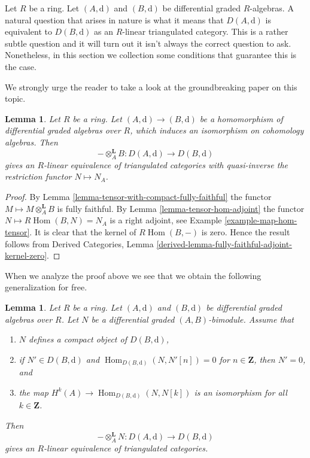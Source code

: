 \documentclass{stacks-project}
\theoremstyle{plain}
\newtheorem{lemma}[subsection]{Lemma}
\theoremstyle{definition}
\theoremstyle{remark}
\numberwithin{equation}{subsection}
\def\Hom{\mathop{\mathrm{Hom}}\nolimits}
\begin{document}
\noindent
Let $R$ be a ring. Let $(A, \text{d})$ and $(B, \text{d})$ be differential
graded $R$-algebras. A natural question that arises in nature is what
it means that $D(A, \text{d})$ is equivalent to $D(B, \text{d})$
as an $R$-linear triangulated category. This is a rather subtle question
and it will turn out it isn't always the correct question to ask.
Nonetheless, in this section we collection some conditions
that guarantee this is the case.

\medskip\noindent
We strongly urge the reader to take a look at the groundbreaking
paper \cite{Rickard} on this topic.

\begin{lemma}
\label{lemma-qis-equivalence}
Let $R$ be a ring. Let $(A, \text{d}) \to (B, \text{d})$ be a
homomorphism of differential graded algebras over $R$, which induces
an isomorphism on cohomology algebras. Then
$$
- \otimes_A^\mathbf{L} B : D(A, \text{d}) \to D(B, \text{d})
$$
gives an $R$-linear equivalence of triangulated categories with
quasi-inverse the restriction functor $N \mapsto N_A$.
\end{lemma}

\begin{proof}
By Lemma \ref{lemma-tensor-with-compact-fully-faithful}
the functor $M \longmapsto M \otimes_A^\mathbf{L} B$ is
fully faithful. By Lemma \ref{lemma-tensor-hom-adjoint}
the functor $N \longmapsto R\Hom(B, N) = N_A$ is a right adjoint, see
Example \ref{example-map-hom-tensor}.
It is clear that the kernel of $R\Hom(B, -)$ is zero.
Hence the result follows from
Derived Categories, Lemma
\ref{derived-lemma-fully-faithful-adjoint-kernel-zero}.
\end{proof}

\noindent
When we analyze the proof above we see that we obtain the
following generalization for free.

\begin{lemma}
\label{lemma-tilting-equivalence}
Let $R$ be a ring. Let $(A, \text{d})$ and $(B, \text{d})$ be 
differential graded algebras over $R$. Let $N$ be a
differential graded $(A, B)$-bimodule. Assume that
\begin{enumerate}
\item $N$ defines a compact object of $D(B, \text{d})$,
\item if $N' \in D(B, \text{d})$ and
$\Hom_{D(B, \text{d})}(N, N'[n]) = 0$ for $n \in \mathbf{Z}$,
then $N' = 0$, and
\item the map $H^k(A) \to \Hom_{D(B, \text{d})}(N, N[k])$ is an
isomorphism for all $k \in \mathbf{Z}$.
\end{enumerate}
Then
$$
- \otimes_A^\mathbf{L} N : D(A, \text{d}) \to D(B, \text{d})
$$
gives an $R$-linear equivalence of triangulated categories.
\end{lemma}
\end{document}
